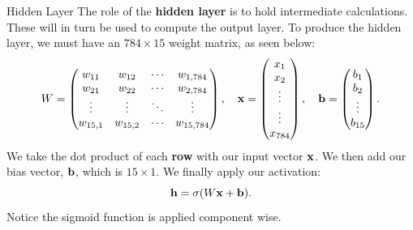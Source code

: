 \documentclass[xcolor=dvipsnames, fontsize=11pt, %
pagesize, %
parskip=half-, t]{beamer}
\begin{document}
\begin{frame}{Hidden Layer}
The role of the \textbf{hidden layer} is to hold intermediate calculations. These will in turn be used to compute the output layer. To produce the hidden layer, we must have an $784\times 15$ weight matrix, as seen below: $$W=\begin{pmatrix} w_{11} & w_{12}  & \cdots &  w_{1,784} \\  w_{21} & w_{22} & \cdots & w_{2,784} \\  \vdots & \vdots  & \ddots & \vdots \\  w_{15, 1} & w_{15, 2}  & \cdots & w_{15, 784} \end{pmatrix}, \quad \bold{x}=\begin{pmatrix} x_1 \\ x_2 \\ \vdots  \\ \vdots \\ x_{784} \end{pmatrix}, \quad \bold{b}=\begin{pmatrix} b_1 \\ b_2 \\ \vdots \\ b_{15} \end{pmatrix}.$$
We take the dot product of each \textbf{row} with our input vector $\bold{x}$. We then add our bias vector, $\bold{b}$, which is $15\times 1$. We finally apply our activation: $$\bold{h}=\sigma(W\bold{x}+\bold{b}).$$
Notice the sigmoid function is applied component wise.
\end{frame}
\end{document}
